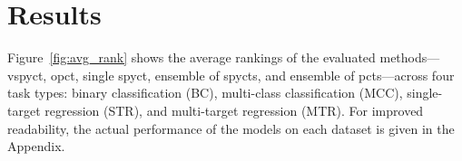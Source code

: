 \documentclass[3p,review,authoryear]{elsarticle}
\begin{document}
\section{Results}

Figure~\ref{fig:avg_rank} shows the average rankings of the evaluated methods—\gls{vspyct}, \gls{opct}, single \gls{spyct}, ensemble of \glspl{spyct}, and ensemble of \glspl{pct}—across four task types: binary classification (BC), multi-class classification (MCC), single-target regression (STR), and multi-target regression (MTR).
For improved readability, the actual performance of the models on each dataset is given in the Appendix.

\begin{figure}[h!]
    \centering
\end{figure}
\end{document}

